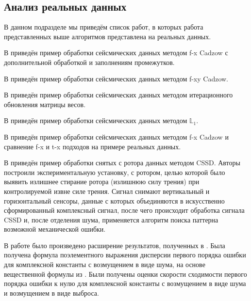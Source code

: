 \documentclass[specialist,
               substylefile = spbu.rtx,
               subf,href,colorlinks=true, 12pt]{disser}
\begin{document}
\subsection{Анализ реальных данных}
\label{sub:realdata}
В данном подразделе мы приведём список работ, в которых работа представленных выше алгоритмов представлена на реальных данных.

В \cite{RajeshTiwari} приведён пример обработки сейсмических данных методом f-x Cadzow с дополнительной обработкой и заполнениям промежутков.

В \cite{Trickett2008} приведён пример обработки сейсмических данных методом f-xy Cadzow.

В \cite{Chen} приведён пример обработки сейсмических данных методом итерационного обновления матрицы весов.

В \cite{Galbraith.etal15} приведён пример обработки сейсмических данных методом $\mathbb{L}_1$.

В \cite{YuanWang11} приведён пример обработки сейсмических данных методом f-x Cadzow и сравнение f-x и t-x подходов на примере реальных данных.


В \cite{Pang.etal19} приведён пример обработки снятых с ротора данных методом CSSD. Авторы построили экспериментальную установку, с ротором, целью которой было выявить излишнее стирание ротора (излишнюю силу трения) при контролируемой извне силе  трения. Сигнал снимают вертикальный и горизонтальный сенсоры, данные с которых объединяются в искусственно сформированный комплексный сигнал, после чего происходит обработка сигнала CSSD и, после отделения шума, применяется алгоритм поиска паттерна возможной механической ошибки.



\conclusion
В работе было произведено расширение результатов, полученных в \cite{SenBach}. Была получена формула поэлементного выражения дисперсии первого порядка ошибки для комплексной константы с возмущением в виде шума, на основе вещественной формулы из \cite{Vlas2008}. Были получены оценки скорости сходимости первого порядка ошибки к нулю для комплексной константы с возмущением в виде шума и возмущением в виде выброса.
\end{document}
